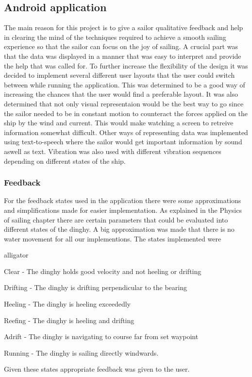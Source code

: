 \subsection{Android application}
The main reason for this project is to give a sailor qualitative feedback and help in clearing the mind of the techniques required to achieve a smooth sailing experience so that the sailor can focus on the joy of sailing. A crucial part was that the data was displayed in a manner that was easy to interpret and provide the help that was called for. To further increase the flexibility of the design it was decided to implement several different user layouts that the user could switch between while running the application. This was determined to be a good way of increasing the chances that the user would find a preferable layout. It was also determined that not only visual representaion would be the best way to go since the sailor needed to be in constant motion to counteract the forces applied on the ship by the wind and current. This would make watching a screen to retreive information somewhat difficult. Other ways of representing data was implemented using text-to-speech where the sailor would get important information by sound aswell as text. Vibration was also used with different vibration sequences depending on different states of the ship.


\subsubsection{Feedback}
For the feedback states used in the application there were some approximations and simplifications made for easier implementation. As explained in the Physics of sailing chapter there are certain parameters that could be evaluated into different states of the dinghy. A big approximation was made that there is no water movement for all our implementions. The states implemented were
\begin{labeling}{alligator}
\item [Clear] - The dinghy holds good velocity and not heeling or drifting
\item [Drifting] - The dinghy is drifting perpendicular to the bearing
\item [Heeling] - The dinghy is heeling exceededly
\item [Reefing] - The dinghy is heeling and drifting
\item [Adrift] - The dinghy is navigating to course far from set waypoint
\item [Running] - The dinghy is sailing directly windwards.
\end{labeling}
Given these states appropriate feedback was given to the user.

